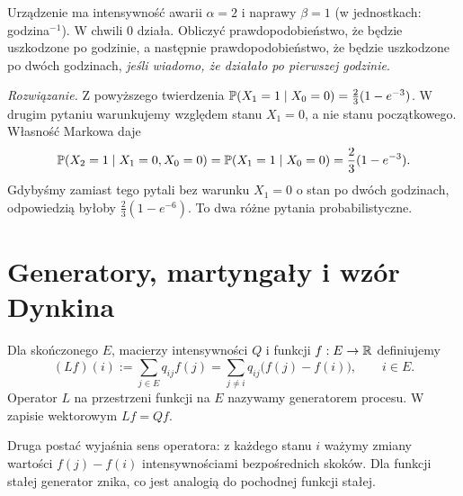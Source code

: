 \begin{zadanie}
Urządzenie ma intensywność awarii $\alpha=2$ i naprawy
$\beta=1$ (w jednostkach: godzina$^{-1}$).
W chwili $0$ działa. Obliczyć prawdopodobieństwo,
że będzie uszkodzone po godzinie, a następnie
prawdopodobieństwo, że będzie uszkodzone po dwóch godzinach,
\emph{jeśli wiadomo, że działało po pierwszej godzinie}.

\emph{Rozwiązanie.} Z powyższego twierdzenia
$\mathbb{P}(X_1=1\mid X_0=0)=\tfrac23(1-e^{-3})$.
W drugim pytaniu warunkujemy względem stanu $X_1=0$,
a nie stanu początkowego. Własność Markowa daje
\[
\mathbb{P}(X_2=1\mid X_1=0,X_0=0)
=\mathbb{P}(X_1=1\mid X_0=0)=\frac23(1-e^{-3}).
\]
Gdybyśmy zamiast tego pytali bez warunku $X_1=0$
o stan po dwóch godzinach, odpowiedzią byłoby
$\tfrac23(1-e^{-6})$. To dwa różne pytania probabilistyczne.
\end{zadanie}

\section{Generatory, martyngały i wzór Dynkina}
\begin{definicja}
Dla skończonego $E$, macierzy intensywności $Q$ i funkcji
$f:E\to\mathbb{R}$ definiujemy
\[
(Lf)(i):=\sum_{j\in E}q_{ij}f(j)
=\sum_{j\ne i}q_{ij}\bigl(f(j)-f(i)\bigr),\qquad i\in E.
\]
Operator $L$ na przestrzeni funkcji na $E$ nazywamy
generatorem procesu. W zapisie wektorowym $Lf=Qf$.
\end{definicja}

Druga postać wyjaśnia sens operatora: z każdego stanu $i$
ważymy zmiany wartości $f(j)-f(i)$ intensywnościami
bezpośrednich skoków. Dla funkcji stałej generator znika,
co jest analogią do pochodnej funkcji stałej.

